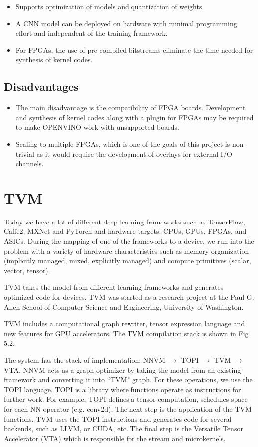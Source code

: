 \documentclass[titlepage]{report}
\begin{document}
 \begin{itemize}
 \item Supports optimization of models and quantization of weights.
 \item A CNN model can be deployed on hardware with minimal programming effort and independent of the training framework.
 \item For FPGAs, the use of pre-compiled bitstreams eliminate the time needed for synthesis of kernel codes.
 \end{itemize}
 
 \subsection{Disadvantages}
 \begin{itemize}
 \item The main disadvantage is the compatibility of FPGA boards. Development and synthesis of kernel codes along with a plugin for FPGAs may be required to make OPENVINO work with unsupported boards. 
 \item Scaling to multiple FPGAs, which is one of the goals of this project is non-trivial as it would require the development of overlays for external I/O channels. 
 \end{itemize}
\section{TVM}

Today we have a lot of different deep learning frameworks such as TensorFlow, Caffe2, MXNet and PyTorch and hardware targets: CPUs, GPUs, FPGAs, and ASICs. During the mapping of one of the frameworks to a device, we run into the problem with a variety of hardware characteristics such as memory organization (implicitly managed, mixed, explicitly managed) and compute primitives (scalar, vector, tensor).

TVM takes the model from different learning frameworks and generates optimized code for devices. TVM was started as a research project at the Paul G. Allen School of Computer Science and Engineering, University of Washington.

TVM includes a computational graph rewriter, tensor expression language and new features for GPU accelerators. The TVM compilation stack is shown in Fig 5.2.

The system has the stack of implementation: NNVM $\to$ TOPI $\to$ TVM $\to$ VTA. NNVM acts as a graph optimizer by taking the model from an existing framework and converting it into “TVM” graph. For these operations, we use the TOPI language. TOPI is a library where functions operate as instructions for further work. For example, TOPI defines a tensor computation, schedules space for each NN operator (e.g. conv2d). The next step is the application of the TVM functions. TVM uses the TOPI instructions and generates code for several backends, such as LLVM, or CUDA, etc. The final step is the Versatile Tensor Accelerator (VTA) which is responsible for the stream and microkernels. 
\end{document}
